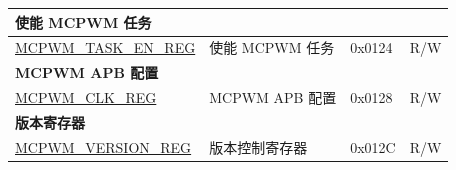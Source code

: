 \begin{longtable}{ | p{6cm} | p{7.2cm} | p{1.2cm} | p{1cm} | }
\multicolumn{4}{|l|}{\textbf{使能 MCPWM 任务}} \\ \hline
\hyperref[regdesc:MCPWMTASKENREG]{MCPWM\_TASK\_EN\_REG} & 使能 MCPWM 任务 & 0x0124 & R/W \\ \hline

\multicolumn{3}{|l|}{\textbf{MCPWM APB 配置}} \\ \hline
\hyperref[regdesc:MCPWMCLKREG]{MCPWM\_CLK\_REG} & MCPWM APB 配置 & 0x0128 & R/W \\ \hline

\multicolumn{3}{|l|}{\textbf{版本寄存器}} \\ \hline
\hyperref[regdesc:MCPWMVERSIONREG]{MCPWM\_VERSION\_REG} & 版本控制寄存器 & 0x012C &  R/W \\ \hline
\end{longtable}
